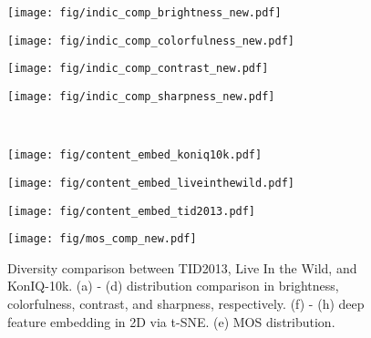 \documentclass{article}
\begin{document}
\begin{figure*}[t]
\vspace{-15pt}
\centering
\begin{minipage}{0.2\linewidth}
\centerline{\texttt{[image: fig/indic\_comp\_brightness\_new.pdf]}}
\end{minipage}
\hspace{8pt}
\begin{minipage}{0.2\linewidth}
\centerline{\texttt{[image: fig/indic\_comp\_colorfulness\_new.pdf]}}
\end{minipage}
\hspace{8pt}
\begin{minipage}{0.2\linewidth}
\centerline{\texttt{[image: fig/indic\_comp\_contrast\_new.pdf]}}
\end{minipage}
\hspace{8pt}
\begin{minipage}{0.2\linewidth}
\centerline{\texttt{[image: fig/indic\_comp\_sharpness\_new.pdf]}}
\end{minipage}\\
\vspace{8pt}
\begin{minipage}{0.2\linewidth}
\centerline{\texttt{[image: fig/content\_embed\_koniq10k.pdf]}}
\end{minipage}
\hspace{8pt}
\begin{minipage}{0.2\linewidth}
\centerline{\texttt{[image: fig/content\_embed\_liveinthewild.pdf]}}
\end{minipage}
\hspace{8pt}
\begin{minipage}{0.2\linewidth}
\centerline{\texttt{[image: fig/content\_embed\_tid2013.pdf]}}
\end{minipage}
\hspace{8pt}
\begin{minipage}{0.2\linewidth}
\centerline{\texttt{[image: fig/mos\_comp\_new.pdf]}}
\end{minipage}
\caption{Diversity comparison between TID2013, Live In the Wild, and KonIQ-10k. (a) - (d) distribution comparison in brightness, colorfulness, contrast, and sharpness, respectively. (f) - (h) deep feature embedding in 2D via t-SNE. (e) MOS distribution.}
\label{fig:diversitycomp}
\vspace{-10pt}
\end{figure*}
\end{document}
